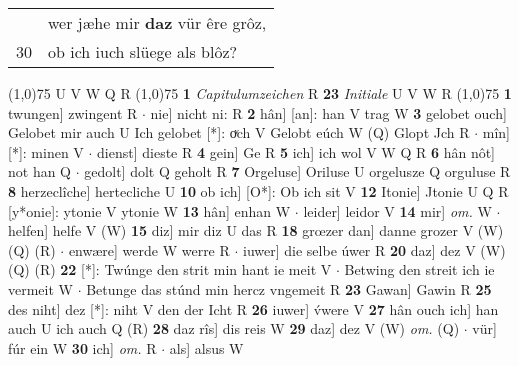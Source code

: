 \documentclass[8pt,a4paper,notitlepage]{article}
\begin{document}
\begin{table}[ht]
\begin{minipage}[t]{0.5\linewidth}
\begin{tabular}{rl}
 & wer jæhe mir \textbf{daz} vür êre grôz,\\ 
30 & ob ich iuch slüege als blôz?\\ 
\end{tabular}
\scriptsize
\line(1,0){75} \newline
U V W Q R \newline
\line(1,0){75} \newline
\textbf{1} \textit{Capitulumzeichen} R  \textbf{23} \textit{Initiale} U V W R  \newline
\line(1,0){75} \newline
\textbf{1} twungen] zwingent R  $\cdot$ nie] nicht ni: R \textbf{2} hân] [an]: han V trag W \textbf{3} gelobet ouch] Gelobet mir auch U Ich gelobet [*]: oͮch V Gelobt eúch W (Q) Glopt Jch R  $\cdot$ mîn] [*]: minen V  $\cdot$ dienst] dieste R \textbf{4} gein] Ge R \textbf{5} ich] ich wol V W Q R \textbf{6} hân nôt] not han Q  $\cdot$ gedolt] dolt Q geholt R \textbf{7} Orgeluse] Oriluse U orgelusze Q orguluse R \textbf{8} herzeclîche] hertecliche U \textbf{10} ob ich] [O*]: Ob ich sit V \textbf{12} Itonie] Jtonie U Q R [y*onie]: ytonie V ytonie W \textbf{13} hân] enhan W  $\cdot$ leider] leidor V \textbf{14} mir] \textit{om.} W  $\cdot$ helfen] helfe V (W) \textbf{15} diz] mir diz U das R \textbf{18} grœzer dan] danne grozer V (W) (Q) (R)  $\cdot$ enwære] werde W werre R  $\cdot$ iuwer] die selbe úwer R \textbf{20} daz] dez V (W) (Q) (R) \textbf{22} [*]: Twúnge den strit min hant ie meit V  $\cdot$ Betwing den streit ich ie vermeit W  $\cdot$ Betunge das stúnd min hercz vngemeit R \textbf{23} Gawan] Gawin R \textbf{25} des niht] dez [*]: niht V den der Icht R \textbf{26} iuwer] v́were V \textbf{27} hân ouch ich] han auch U ich auch Q (R) \textbf{28} daz rîs] dis reis W \textbf{29} daz] dez V (W) \textit{om.} (Q)  $\cdot$ vür] fúr ein W \textbf{30} ich] \textit{om.} R  $\cdot$ als] alsus W \newline
\end{minipage}
\end{table}
\end{document}
